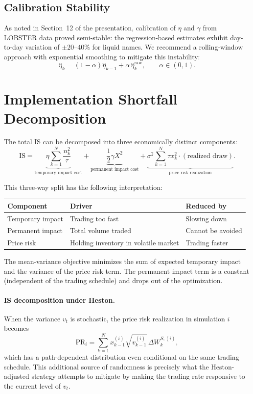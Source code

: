 \documentclass[11pt]{article}
\begin{document}
\subsection{Calibration Stability}

As noted in Section~12 of the presentation, calibration of $\eta$ and $\gamma$ from LOBSTER data proved semi-stable: the regression-based estimates exhibit day-to-day variation of $\pm 20$--$40\%$ for liquid names. We recommend a rolling-window approach with exponential smoothing to mitigate this instability:
\[
\hat\eta_k = (1-\alpha)\hat\eta_{k-1} + \alpha\,\hat\eta_k^{\text{raw}}, \qquad \alpha \in (0,1).
\]

\section{Implementation Shortfall Decomposition}
\label{app:is_decomp}

The total IS can be decomposed into three economically distinct components:
\[
\text{IS}
=
\underbrace{\eta\sum_{k=1}^N \frac{n_k^2}{\tau}}_{\text{temporary impact cost}}
+
\underbrace{\frac{1}{2}\gamma X^2}_{\text{permanent impact cost}}
+
\underbrace{\sigma^2\sum_{k=1}^N \tau x_k^2 \cdot (\text{realized draw})}_{\text{price risk realization}}.
\]

This three-way split has the following interpretation:

\begin{center}
\begin{tabular}{lll}
\toprule
Component & Driver & Reduced by \\
\midrule
Temporary impact & Trading too fast & Slowing down \\
Permanent impact & Total volume traded & Cannot be avoided \\
Price risk & Holding inventory in volatile market & Trading faster \\
\bottomrule
\end{tabular}
\end{center}

The mean-variance objective minimizes the sum of expected temporary impact and the variance of the price risk term. The permanent impact term is a constant (independent of the trading schedule) and drops out of the optimization.

\paragraph{IS decomposition under Heston.}
When the variance $v_t$ is stochastic, the price risk realization in simulation $i$ becomes
\[
\text{PR}_i = \sum_{k=1}^N x_{k-1}^{(i)}\sqrt{v_{k-1}^{(i)}}\,\Delta W_k^{S,(i)},
\]
which has a path-dependent distribution even conditional on the same trading schedule. This additional source of randomness is precisely what the Heston-adjusted strategy attempts to mitigate by making the trading rate responsive to the current level of $v_t$.
\end{document}
